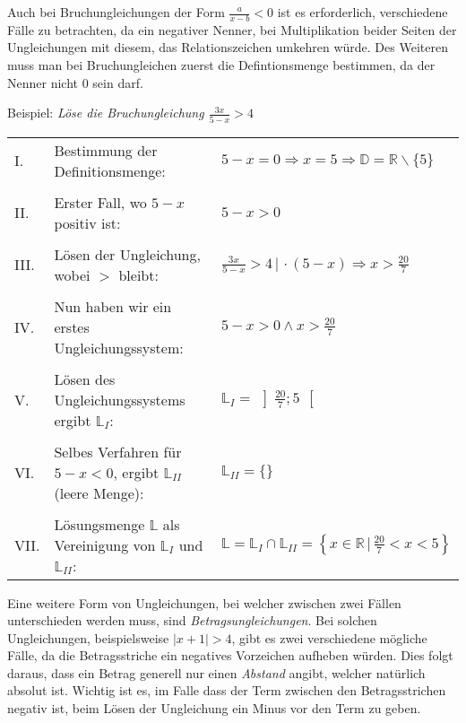 
Auch bei Bruchungleichungen der Form $\frac{a}{x - b} < 0$ ist es erforderlich, verschiedene F\"{a}lle zu betrachten, da ein negativer Nenner, bei Multiplikation beider Seiten der Ungleichungen mit diesem, das Relationszeichen umkehren w\"{u}rde. Des Weiteren muss man bei Bruchungleichen zuerst die Defintionsmenge bestimmen, da der Nenner nicht 0 sein darf.

Beispiel: \emph{L\"{o}se die Bruchungleichung $\frac{3x}{5 - x} > 4$}

\begin{table}[h!]
	\begin{tabular}{p{0.3cm} p{8.5cm} l}
		I. & Bestimmung der Definitionsmenge: & $5 - x = 0 \Rightarrow x = 5 \Rightarrow \mathbb{D} = \mathbb{R} \backslash \{5\}$
		\\ && \\
		II. & Erster Fall, wo $5 - x$ positiv ist: & $5 - x > 0$
		\\ && \\
		III. & L\"{o}sen der Ungleichung, wobei $>$ bleibt: & $\frac{3x}{5 - x} > 4 \,|\, \cdot (5 - x) \Rightarrow x > \frac{20}{7}$
		\\ && \\
		IV. & Nun haben wir ein erstes Ungleichungssystem: & $5 - x > 0 \land x > \frac{20}{7}$
		\\ && \\
		V. & L\"{o}sen des Ungleichungssystems ergibt $\mathbb{L}_{I}$: & $\mathbb{L}_{I} = \,\left]\frac{20}{7};5\,\right[$
		\\ && \\
		VI. & Selbes Verfahren f\"{u}r $5 - x < 0$, ergibt $\mathbb{L}_{II}$ (leere Menge): & $\mathbb{L}_{II} = \{ \}$
		\\ && \\
		VII. & L\"{o}sungsmenge $\mathbb{L}$ als Vereinigung von $\mathbb{L}_{I}$ und $\mathbb{L}_{II}$: & $\mathbb{L} = \mathbb{L}_I \cap \mathbb{L}_{II} = \left\{x \in \mathbb{R} \,|\, \frac{20}{7} < x < 5 \right\}$
	\end{tabular}
\end{table}

\pagebreak


Eine weitere Form von Ungleichungen, bei welcher zwischen zwei F\"{a}llen unterschieden werden muss, sind \emph{Betragsungleichungen}. Bei solchen Ungleichungen, beispielsweise $|x + 1| > 4$, gibt es zwei verschiedene m\"{o}gliche F\"{a}lle, da die Betragsstriche ein negatives Vorzeichen aufheben w\"{u}rden. Dies folgt daraus, dass ein Betrag generell nur einen \emph{Abstand} angibt, welcher nat\"{u}rlich absolut ist. Wichtig ist es, im Falle dass der Term zwischen den Betragsstrichen negativ ist, beim L\"{o}sen der Ungleichung ein Minus vor den Term zu geben.


